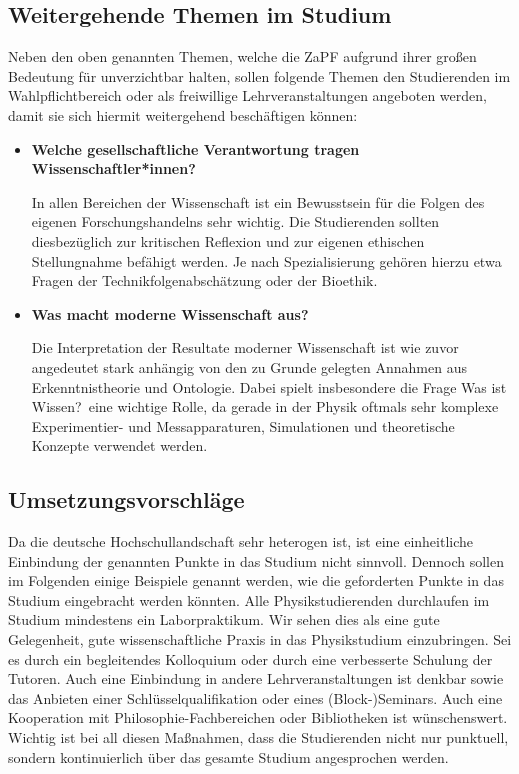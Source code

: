 \subsection*{Weitergehende Themen im Studium}
Neben den oben genannten Themen, welche die ZaPF aufgrund ihrer großen Bedeutung für unverzichtbar halten, sollen folgende Themen den Studierenden im Wahlpflichtbereich oder als freiwillige Lehrveranstaltungen angeboten werden, damit sie sich hiermit weitergehend beschäftigen können:
\begin{itemize}
\item \textbf{Welche gesellschaftliche Verantwortung tragen Wissenschaftler*innen?}
    \par In allen Bereichen der Wissenschaft ist ein Bewusstsein für die Folgen des eigenen Forschungshandelns sehr wichtig. Die Studierenden sollten diesbezüglich zur kritischen Reflexion und zur eigenen ethischen Stellungnahme befähigt werden. Je nach Spezialisierung gehören hierzu etwa Fragen der Technikfolgenabschätzung oder der Bioethik.
\item \textbf{Was macht moderne Wissenschaft aus?}
    \par Die Interpretation der Resultate moderner Wissenschaft ist wie zuvor angedeutet stark anhängig von den zu Grunde gelegten Annahmen aus Erkenntnistheorie und Ontologie. Dabei spielt insbesondere die Frage \glqq Was ist Wissen?\grqq\ eine wichtige Rolle, da gerade in der Physik oftmals sehr komplexe Experimentier- und Messapparaturen, Simulationen und theoretische Konzepte verwendet werden. 
   \end{itemize}

\subsection*{Umsetzungsvorschläge}
\par Da die deutsche Hochschullandschaft sehr heterogen ist, ist eine einheitliche Einbindung der genannten Punkte in das Studium nicht sinnvoll. Dennoch sollen im Folgenden einige Beispiele genannt werden, wie die geforderten Punkte in das Studium eingebracht werden könnten.
Alle Physikstudierenden durchlaufen im Studium mindestens ein Laborpraktikum. Wir sehen dies als eine gute Gelegenheit, gute wissenschaftliche Praxis in das Physikstudium einzubringen. Sei es durch ein begleitendes Kolloquium oder durch eine verbesserte Schulung der Tutoren.
Auch eine Einbindung in andere Lehrveranstaltungen ist denkbar sowie das Anbieten einer Schlüsselqualifikation oder eines (Block-)Seminars. Auch eine Kooperation mit Philosophie-Fachbereichen oder Bibliotheken ist wünschenswert.\\
Wichtig ist bei all diesen Maßnahmen, dass die Studierenden nicht nur punktuell, sondern kontinuierlich über das gesamte Studium angesprochen werden.
